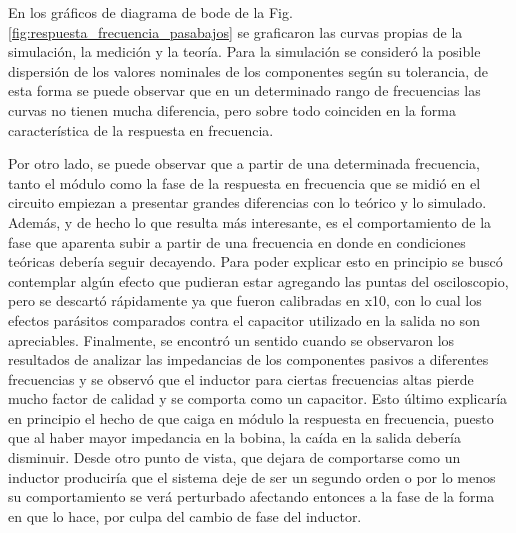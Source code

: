 En los gr\'aficos de diagrama de bode de la Fig. \ref{fig:respuesta_frecuencia_pasabajos} se graficaron las curvas propias de la simulaci\'on, la medici\'on y la teor\'ia. Para la simulaci\'on se consider\'o la posible dispersi\'on de los valores
nominales de los componentes seg\'un su tolerancia, de esta forma se puede observar que en un determinado rango de frecuencias las curvas no tienen mucha diferencia, pero sobre todo coinciden en la forma caracter\'istica de la respuesta en frecuencia.

Por otro lado, se puede observar que a partir de una determinada frecuencia, tanto el m\'odulo como la fase de la respuesta en frecuencia que se midi\'o en el circuito empiezan a presentar grandes diferencias con lo te\'orico y lo simulado. Adem\'as, y de hecho lo que resulta m\'as interesante,
es el comportamiento de la fase que aparenta subir a partir de una frecuencia en donde en condiciones te\'oricas deber\'ia seguir decayendo. Para poder explicar esto en principio se busc\'o contemplar alg\'un efecto que pudieran estar agregando las puntas del osciloscopio, pero se descart\'o r\'apidamente
ya que fueron calibradas en x10, con lo cual los efectos par\'asitos comparados contra el capacitor utilizado en la salida no son apreciables. Finalmente, se encontr\'o un sentido cuando se observaron los resultados de analizar las impedancias de los componentes pasivos a diferentes frecuencias y se observ\'o
que el inductor para ciertas frecuencias altas pierde mucho factor de calidad y se comporta como un capacitor. Esto \'ultimo explicar\'ia en principio el hecho de que caiga en m\'odulo la respuesta en frecuencia, puesto que al haber mayor impedancia en la bobina, la ca\'ida en la salida deber\'ia disminuir. Desde otro 
punto de vista, que dejara de comportarse como un inductor producir\'ia que el sistema deje de ser un segundo orden o por lo menos su comportamiento se ver\'a perturbado afectando entonces a la fase de la forma en que lo hace, por culpa del cambio de fase del inductor.